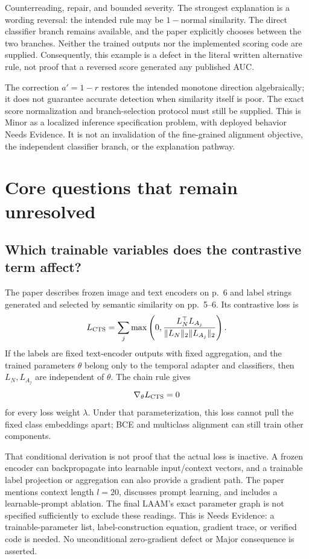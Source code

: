 \documentclass[10pt]{article}
\begin{document}
Counterreading, repair, and bounded severity. The strongest explanation is a wording reversal: the intended rule may be \(1-\)normal similarity. The direct classifier branch remains available, and the paper explicitly chooses between the two branches. Neither the trained outputs nor the implemented scoring code are supplied. Consequently, this example is a defect in the literal written alternative rule, not proof that a reversed score generated any published AUC.\par
The correction \(a'=1-r\) restores the intended monotone direction algebraically; it does not guarantee accurate detection when similarity itself is poor. The exact score normalization and branch-selection protocol must still be supplied. This is Minor as a localized inference specification problem, with deployed behavior Needs Evidence. It is not an invalidation of the fine-grained alignment objective, the independent classifier branch, or the explanation pathway.\par
\section*{Core questions that remain unresolved}
\subsection*{Which trainable variables does the contrastive term affect?}
The paper describes frozen image and text encoders on p. 6 and label strings generated and selected by semantic similarity on pp. 5–6. Its contrastive loss is \[L_{\rm CTS}=\sum_j\max\left(0,
 \frac{L_N^\top L_{A_j}}{\|L_N\|_2\|L_{A_j}\|_2}\right).\] If the labels are fixed text-encoder outputs with fixed aggregation, and the trained parameters \(\theta\) belong only to the temporal adapter and classifiers, then \(L_N,L_{A_j}\) are independent of \(\theta\). The chain rule gives \[\nabla_\theta L_{\rm CTS}=0\] for every loss weight \(\lambda\). Under that parameterization, this loss cannot pull the fixed class embeddings apart; BCE and multiclass alignment can still train other components.\par
That conditional derivation is not proof that the actual loss is inactive. A frozen encoder can backpropagate into learnable input/context vectors, and a trainable label projection or aggregation can also provide a gradient path. The paper mentions context length \(l=20\), discusses prompt learning, and includes a learnable-prompt ablation. The final LAAM’s exact parameter graph is not specified sufficiently to exclude these readings. This is Needs Evidence: a trainable-parameter list, label-construction equation, gradient trace, or verified code is needed. No unconditional zero-gradient defect or Major consequence is asserted.\par
\end{document}
